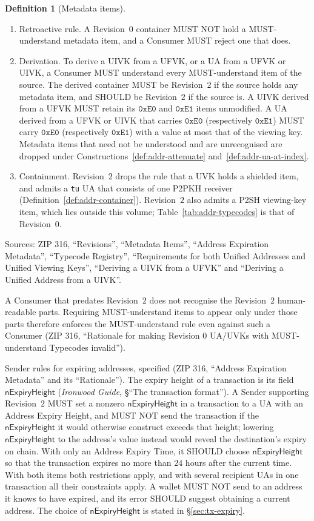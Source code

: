 \documentclass[11pt,a4paper]{article}
\theoremstyle{definition}
\newtheorem{definition}[theorem]{Definition}
\begin{document}
\begin{definition}[Metadata items]
\begin{enumerate}
\item Retroactive rule. A Revision~$0$ container MUST NOT hold a
  MUST-understand metadata item, and a Consumer MUST reject one that does.
\item Derivation. To derive a UIVK from a UFVK, or a UA from a UFVK or UIVK,
  a Consumer MUST understand every MUST-understand item of the source. The
  derived container MUST be Revision~$2$ if the source holds any metadata
  item, and SHOULD be Revision~$2$ if the source is. A UIVK derived from a
  UFVK MUST retain its $\mathtt{0xE0}$ and $\mathtt{0xE1}$ items unmodified.
  A UA derived from a UFVK or UIVK that carries $\mathtt{0xE0}$
  (respectively $\mathtt{0xE1}$) MUST carry $\mathtt{0xE0}$ (respectively
  $\mathtt{0xE1}$) with a value at most that of the viewing key. Metadata
  items that need not be understood and are unrecognised are dropped under
  Constructions~\ref{def:addr-attenuate} and~\ref{def:addr-ua-at-index}.
\item Containment. Revision~$2$ drops the rule that a UVK holds a shielded
  item, and admits a \texttt{tu} UA that consists of one P2PKH receiver
  (Definition~\ref{def:addr-container}). Revision~$2$ also admits a P2SH
  viewing-key item, which lies outside this volume;
  Table~\ref{tab:addr-typecodes} is that of Revision~$0$.
\end{enumerate}
Sources: ZIP 316, ``Revisions'', ``Metadata Items'', ``Address Expiration
Metadata'', ``Typecode Registry'', ``Requirements for both Unified Addresses
and Unified Viewing Keys'', ``Deriving a UIVK from a UFVK'' and ``Deriving a
Unified Address from a UIVK''.
\end{definition}

A Consumer that predates Revision~$2$ does not recognise the Revision~$2$
human-readable parts. Requiring MUST-understand items to appear only under
those parts therefore enforces the MUST-understand rule even against such a
Consumer (ZIP 316, ``Rationale for making Revision 0 UA/UVKs with
MUST-understand Typecodes invalid'').

Sender rules for expiring addresses, specified (ZIP 316, ``Address
Expiration Metadata'' and its ``Rationale''). The expiry height of a
transaction is its field $\mathsf{nExpiryHeight}$ (\emph{Ironwood Guide},
\S``The transaction format''). A Sender supporting Revision~$2$ MUST set a
nonzero $\mathsf{nExpiryHeight}$ in a transaction to a UA with an Address
Expiry Height, and MUST NOT send the transaction if the
$\mathsf{nExpiryHeight}$ it would otherwise construct exceeds that height;
lowering $\mathsf{nExpiryHeight}$ to the address's value instead would
reveal the destination's expiry on chain. With only an Address Expiry Time,
it SHOULD choose $\mathsf{nExpiryHeight}$ so that the transaction expires no
more than $24$ hours after the current time. With both items both
restrictions apply, and with several recipient UAs in one transaction all
their constraints apply. A wallet MUST NOT send to an address it knows to
have expired, and its error SHOULD suggest obtaining a current address. The
choice of $\mathsf{nExpiryHeight}$ is stated in \S\ref{sec:tx-expiry}.
\end{document}
